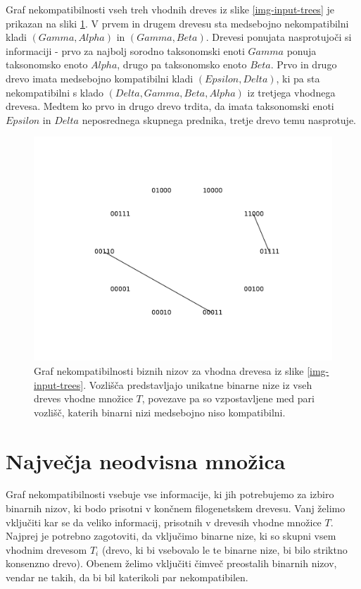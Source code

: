 \documentclass[a4paper, 12pt]{book}
\begin{document}
Graf nekompatibilnosti vseh treh vhodnih dreves iz slike \ref{img-input-trees} je prikazan na sliki \ref{img-incompat-graph-example}. V prvem in drugem drevesu sta medsebojno nekompatibilni kladi $(Gamma, Alpha)$ in $(Gamma, Beta)$. Drevesi ponujata nasprotujoči si informaciji - prvo za najbolj sorodno taksonomski enoti $Gamma$ ponuja taksonomsko enoto $Alpha$, drugo pa taksonomsko enoto $Beta$. Prvo in drugo drevo imata medsebojno kompatibilni kladi $(Epsilon, Delta)$, ki pa sta nekompatibilni s klado $(Delta, Gamma, Beta, Alpha)$ iz tretjega vhodnega drevesa. Medtem ko prvo in drugo drevo trdita, da imata taksonomski enoti $Epsilon$ in $Delta$ neposrednega skupnega prednika, tretje drevo temu nasprotuje.

\begin{figure}
	\begin{center}
		\includegraphics[scale=0.7, clip=true, trim=2cm 2cm 2cm 2cm]{gfx/incompat_graph.pdf}
	\end{center}
	\caption{Graf nekompatibilnosti biznih nizov za vhodna drevesa iz slike \ref{img-input-trees}. Vozlišča predstavljajo unikatne binarne nize iz vseh dreves vhodne množice $T$, povezave pa so vzpostavljene med pari vozlišč, katerih binarni nizi medsebojno niso kompatibilni.}
	\label{img-incompat-graph-example}
\end{figure}

\section{Največja neodvisna množica}
Graf nekompatibilnosti vsebuje vse informacije, ki jih potrebujemo za izbiro binarnih nizov, ki bodo prisotni v končnem filogenetskem drevesu. Vanj želimo vključiti kar se da veliko informacij, prisotnih v drevesih vhodne množice $T$. Najprej je potrebno zagotoviti, da vključimo binarne nize, ki so skupni vsem vhodnim drevesom $T_i$ (drevo, ki bi vsebovalo le te binarne nize, bi bilo striktno konsenzno drevo). Obenem želimo vključiti čimveč preostalih binarnih nizov, vendar ne takih, da bi bil katerikoli par nekompatibilen. 
\end{document}
